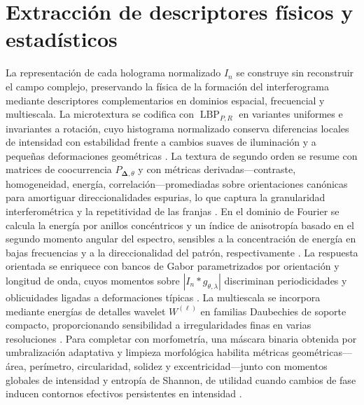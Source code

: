 \section{Extracción de descriptores físicos y estadísticos}
La representación de cada holograma normalizado \(I_{n}\) se construye sin reconstruir el campo complejo, preservando la física de la formación del interferograma mediante descriptores complementarios en dominios espacial, frecuencial y multiescala. La microtextura se codifica con \(\operatorname{LBP}_{P,R}\) en variantes uniformes e invariantes a rotación, cuyo histograma normalizado conserva diferencias locales de intensidad con estabilidad frente a cambios suaves de iluminación y a pequeñas deformaciones geométricas \cite{Dheepak2023}. La textura de segundo orden se resume con matrices de coocurrencia \(P_{\boldsymbol{\Delta},\theta}\) y con métricas derivadas—contraste, homogeneidad, energía, correlación—promediadas sobre orientaciones canónicas para amortiguar direccionalidades espurias, lo que captura la granularidad interferométrica y la repetitividad de las franjas \cite{Barburiceanu2021}. En el dominio de Fourier se calcula la energía por anillos concéntricos y un índice de anisotropía basado en el segundo momento angular del espectro, sensibles a la concentración de energía en bajas frecuencias y a la direccionalidad del patrón, respectivamente \cite{Amann2019,OConnor2020}. La respuesta orientada se enriquece con bancos de Gabor parametrizados por orientación y longitud de onda, cuyos momentos sobre \(|I_{n}*g_{\theta,\lambda}|\) discriminan periodicidades y oblicuidades ligadas a deformaciones típicas \cite{Alzubaidi2020}. La multiescala se incorpora mediante energías de detalles wavelet \(W^{(\ell)}\) en familias Daubechies de soporte compacto, proporcionando sensibilidad a irregularidades finas en varias resoluciones \cite{Alzubaidi2020}. Para completar con morfometría, una máscara binaria obtenida por umbralización adaptativa y limpieza morfológica habilita métricas geométricas—área, perímetro, circularidad, solidez y excentricidad—junto con momentos globales de intensidad y entropía de Shannon, de utilidad cuando cambios de fase inducen contornos efectivos persistentes en intensidad \cite{Singh2017,Alzubaidi2020}.

